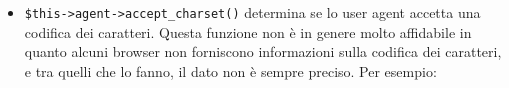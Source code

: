\begin{itemize}
\item \verb|$this->agent->accept_charset()| determina se lo user agent accetta una codifica dei caratteri. Questa funzione non è in genere molto affidabile in quanto alcuni browser non forniscono informazioni sulla codifica dei caratteri, e tra quelli che lo fanno, il dato non è sempre preciso. Per esempio:

\end{itemize}
